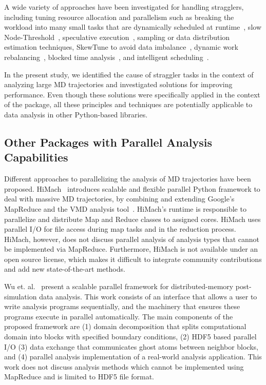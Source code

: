 A wide variety of approaches have been investigated for handling stragglers, including tuning resource allocation and parallelism such as breaking the workload into many small tasks that are dynamically scheduled at runtime~\cite{Rosen2012}, slow Node-Threshold~\cite{Dean2004}, speculative execution~\cite{Dean2004}, sampling or data distribution estimation techniques, SkewTune to avoid data imbalance~\cite{Kwon2012}, dynamic work rebalancing~\cite{Schmidt2016}, blocked time analysis~\cite{Ousterhout2015}, and intelligent scheduling~\cite{AWE-WQ2014}. 

In the present study, we identified the cause of straggler tasks in the context of analyzing large MD trajectories and investigated solutions for improving performance.
Even though these solutions were specifically applied in the context of the  package, all these principles and  techniques are potentially applicable to data analysis in other Python-based libraries.

\subsection{Other Packages with Parallel Analysis Capabilities}
\label{sec:otherparallel}

Different approaches to parallelizing the analysis of MD trajectories have been proposed.
HiMach~\cite{himach-2008} introduces scalable and flexible parallel Python framework to deal with massive MD trajectories, by combining and extending Google's MapReduce and the VMD analysis tool~\cite{Hum96}. 
HiMach's runtime is responsible to parallelize and distribute Map and Reduce classes to assigned cores.
HiMach uses parallel I/O for file access during map tasks and  in the reduction process. 
HiMach, however, does not discuss parallel analysis of analysis types that cannot be implemented via MapReduce.
Furthermore, HiMach is not available under an open source license, which makes it difficult to integrate community contributions and add new state-of-the-art methods.

Wu et. al.~\cite{Wu_et.al} present a scalable parallel framework for distributed-memory post-simulation data analysis.
This work consists of an interface that allows a user to write analysis programs sequentially, and the machinery that ensures these programs execute in parallel automatically. 
The main components of the proposed framework are (1) domain decomposition that splits computational domain into blocks with specified boundary conditions, (2) HDF5 based parallel I/O (3) data exchange that communicates ghost atoms between neighbor blocks, and (4) parallel analysis implementation of a real-world analysis application.
This work does not discuss analysis methods which cannot be implemented using MapReduce and is limited to HDF5 file format.

